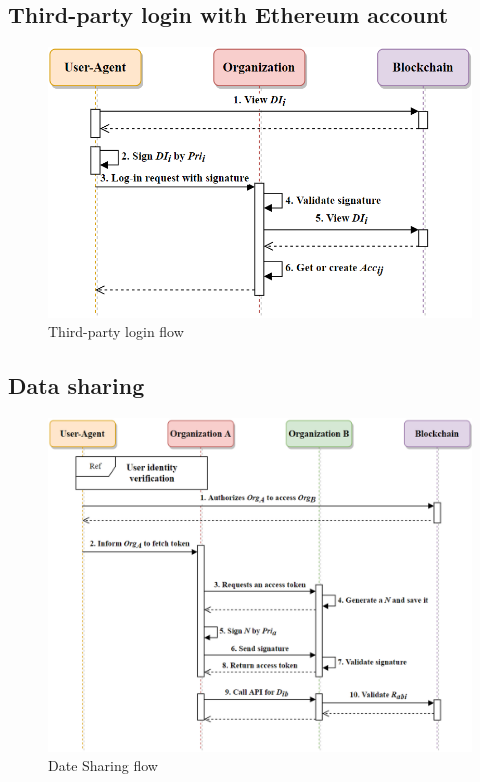     \newpage
    \subsection{Third-party login with Ethereum account}
    \begin{figure}[htb]
        \centering
        \includegraphics[height=!,width=0.8\linewidth,keepaspectratio=true]{figures/Third_party_login.png}
        \caption{{\footnotesize Third-party login flow}}
        \label{fig:thirdPartyLogin}
    \end{figure}


    \newpage
    \subsection{Data sharing}
    \begin{figure}[htb]
        \centering
        \includegraphics[height=!,width=1\linewidth,keepaspectratio=true]{figures/data_sharing.png}
        \caption{{\footnotesize Date Sharing flow}}
        \label{fig:dataSharing}
    \end{figure}

    \newpage